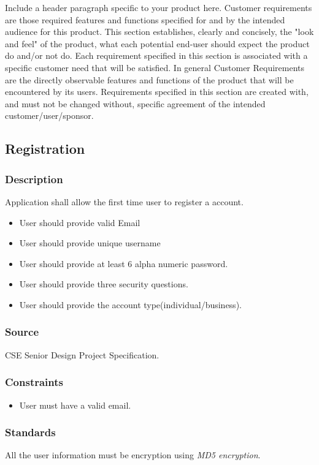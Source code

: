 Include a header paragraph specific to your product here. Customer requirements are those required features and functions specified for and by the intended audience for this product. This section establishes, clearly and concisely, the "look and feel" of the product, what each potential end-user should expect the product do and/or not do. Each requirement specified in this section is associated with a specific customer need that will be satisfied. In general Customer Requirements are the directly observable features and functions of the product that will be encountered by its users. Requirements specified in this section are created with, and must not be changed without, specific agreement of the intended customer/user/sponsor.

\subsection{Registration}
\subsubsection{Description}
Application shall allow the first time user to register a account.
\begin{itemize}
\item User should provide valid Email
\item User should provide unique username
\item User should provide at least 6 alpha numeric password.
\item User should provide three security questions.
\item User should provide the account type(individual/business).
\end{itemize}

\subsubsection{Source}
CSE Senior Design Project Specification.
\subsubsection{Constraints}
\begin{itemize}
\item User must have a valid email. 
\end{itemize}

\subsubsection{Standards}
All the user information must be encryption using \textit{MD5 encryption}.

